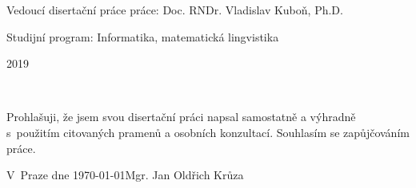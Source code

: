 \documentclass[12pt,notitlepage]{report}
\begin{document}
\begin{titlepage}
\large
\noindent Vedoucí disertační práce práce: Doc. RNDr. Vladislav Kuboň, Ph.D.

\noindent Studijní program: Informatika, matematická lingvistika

\vspace{20mm}

\begin{center}
2019
\end{center}

\end{titlepage} %

\thispagestyle{empty} %
\normalsize %
\ \vspace{10mm} 


\vspace{\fill} %
\noindent Prohlašuji, že jsem svou disertační práci napsal samostatně a výhradně
s~použitím citovaných pramenů a osobních konzultací. Souhlasím se zapůjčováním
práce.

\bigskip
\noindent V~Praze dne \today \hspace{\fill}Mgr. Jan Oldřich Krůza

\setcounter{page}{2} %
\tableofcontents %

\newpage %



\newpage















\end{document}

